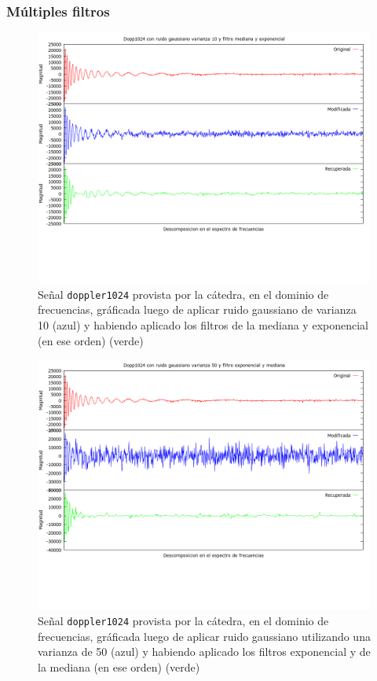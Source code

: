 \subsubsection{M\'ultiples filtros}

\begin{figure}[H]
\begin {center}
\includegraphics[width=500pt]{imagenes/dopp1024-gauss-10-both.png}
\end {center}
\caption{Se\~nal \texttt{doppler1024} provista por la c\'atedra, en el dominio de frecuencias, gr\'aficada
    luego de aplicar ruido gaussiano de varianza 10 (azul) y 
habiendo aplicado los filtros de la mediana y exponencial (en ese orden) (verde)}
\label{fig:medexpGauss10}
\end{figure}

\begin{figure}[H]
\begin {center}
\includegraphics[width=500pt]{imagenes/dopp1024-gauss-50-bothr.png}
\end {center}
\caption{Se\~nal \texttt{doppler1024} provista por la c\'atedra, en el dominio de frecuencias, gr\'aficada
luego de aplicar ruido gaussiano utilizando una varianza de 50 (azul) y 
habiendo aplicado los filtros exponencial y de la mediana (en ese orden) (verde)}
\label{fig:expmedGauss50}
\end{figure}

